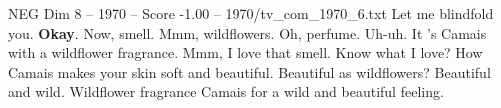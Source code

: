 \begin{textsample}{NEG Dim 8 – 1970 – Score -1.00 – 1970/tv\_com\_1970\_6.txt}  \label{ex:f8_neg_015}
Let me blindfold you. \textbf{Okay}.
Now, smell.
Mmm, wildflowers.
Oh, perfume.
Uh-uh.
It 's Camais with a wildflower fragrance.
Mmm, I love that smell.
Know what I love?
How Camais makes your skin soft and beautiful.
Beautiful as wildflowers?
Beautiful and wild.
Wildflower fragrance Camais for a wild and beautiful feeling.

\end{textsample}
